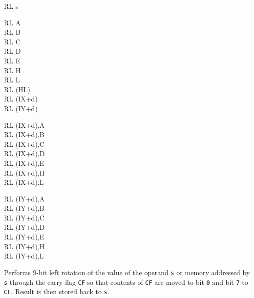 \begin{basedescript}{
    \desclabelstyle{\multilinelabel}
    \desclabelwidth{3cm}}
\begin{DetailItem}{RL s}
        \begin{DetailVariants}
            RL A\\
            RL B\\
            RL C\\
            RL D\\
            RL E\\
            RL H\\
            RL L\\
            RL (HL)\\
            RL (IX+d)\\
            RL (IY+d)

            \columnbreak
            RL (IX+d),A\UNDOC\\
            RL (IX+d),B\UNDOC\\
            RL (IX+d),C\UNDOC\\
            RL (IX+d),D\UNDOC\\
            RL (IX+d),E\UNDOC\\
            RL (IX+d),H\UNDOC\\
            RL (IX+d),L\UNDOC

            \columnbreak
            RL (IY+d),A\UNDOC\\
            RL (IY+d),B\UNDOC\\
            RL (IY+d),C\UNDOC\\
            RL (IY+d),D\UNDOC\\
            RL (IY+d),E\UNDOC\\
            RL (IY+d),H\UNDOC\\
            RL (IY+d),L\UNDOC
        \end{DetailVariants}

        Performs 9-bit left rotation of the value of the operand {\tt s} or memory addressed by {\tt s} through the carry flag {\tt CF} so that contents of {\tt CF} are moved to bit {\tt 0} and bit {\tt 7} to {\tt CF}. Result is then stored back to {\tt s}.

        \begin{DetailEffects}[p]
            \FlagsRLr
        \end{DetailEffects}
						
        \begin{DetailTiming}
        \end{DetailTiming}


\end{DetailItem}
\end{basedescript}
